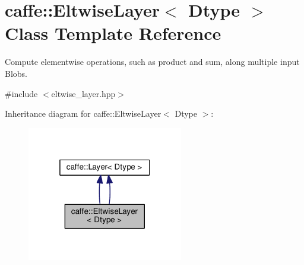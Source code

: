 \hypertarget{classcaffe_1_1_eltwise_layer}{}\section{caffe\+:\+:Eltwise\+Layer$<$ Dtype $>$ Class Template Reference}
\label{classcaffe_1_1_eltwise_layer}


Compute elementwise operations, such as product and sum, along multiple input Blobs.  




{\ttfamily \#include $<$eltwise\+\_\+layer.\+hpp$>$}



Inheritance diagram for caffe\+:\+:Eltwise\+Layer$<$ Dtype $>$\+:
\nopagebreak
\begin{figure}[H]
\begin{center}
\leavevmode
\includegraphics[width=193pt]{classcaffe_1_1_eltwise_layer__inherit__graph}
\end{center}
\end{figure}
